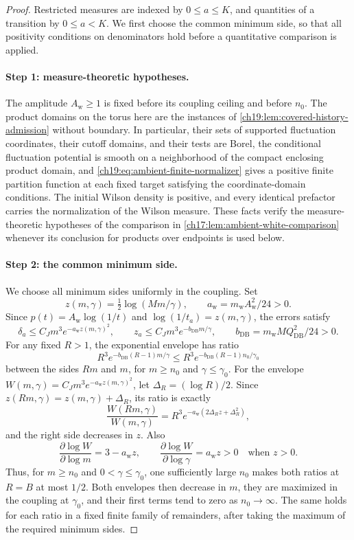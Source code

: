 \begin{proof}
Restricted measures are indexed by $0\le a\le K$, and quantities of a transition by $0\le a<K$. We first choose the common minimum side, so that all positivity conditions on denominators hold before a quantitative comparison is applied.

\paragraph{Step 1: measure-theoretic hypotheses.}
The amplitude $A_{\mathrm w}\ge1$ is fixed before its coupling ceiling and before $n_0$. The product domains on the torus here are the instances of \cref{ch19:lem:covered-history-admission} without boundary. In particular, their sets of supported fluctuation coordinates, their cutoff domains, and their tests are Borel, the conditional fluctuation potential is smooth on a neighborhood of the compact enclosing product domain, and \eqref{ch19:eq:ambient-finite-normalizer} gives a positive finite partition function at each fixed target satisfying the coordinate-domain conditions. The initial Wilson density is positive, and every identical prefactor carries the normalization of the Wilson measure. These facts verify the measure-theoretic hypotheses of the comparison in \cref{ch17:lem:ambient-white-comparison} whenever its conclusion for products over endpoints is used below.

\paragraph{Step 2: the common minimum side.}
We choose all minimum sides uniformly in the coupling. Set
\[
 z(m,\gamma)=\tfrac12\log(Mm/\gamma),\qquad a_{\mathrm w}=m_{\mathrm w}A_{\mathrm w}^2/24>0.
\]
Since $p(t)=A_{\mathrm w}\log(1/t)$ and $\log(1/t_a)=z(m,\gamma)$, the errors satisfy
\[
 \delta_a\le C_Jm^3e^{-a_{\mathrm w}z(m,\gamma)^2},\qquad
 z_a\le C_Jm^3e^{-b_{\mathrm{DB}}m/\gamma},\qquad
 b_{\mathrm{DB}}=m_{\mathrm w}MQ_{\mathrm{DB}}^2/24>0.
\]
For any fixed $R>1$, the exponential envelope has ratio
\[
 R^3e^{-b_{\mathrm{DB}}(R-1)m/\gamma}\le R^3e^{-b_{\mathrm{DB}}(R-1)n_0/\gamma_0}
\]
between the sides $Rm$ and $m$, for $m\ge n_0$ and $\gamma\le\gamma_0$. For the envelope $W(m,\gamma)=C_Jm^3e^{-a_{\mathrm w}z(m,\gamma)^2}$, let $\Delta_R=(\log R)/2$. Since $z(Rm,\gamma)=z(m,\gamma)+\Delta_R$, its ratio is exactly
\[
 \frac{W(Rm,\gamma)}{W(m,\gamma)}=R^3e^{-a_{\mathrm w}(2\Delta_Rz+\Delta_R^2)},
\]
and the right side decreases in $z$. Also
\[
 \frac{\partial\log W}{\partial\log m}=3-a_{\mathrm w}z,\qquad
 \frac{\partial\log W}{\partial\log\gamma}=a_{\mathrm w}z>0\quad\text{when }z>0.
\]
Thus, for $m\ge n_0$ and $0<\gamma\le\gamma_0$, one sufficiently large $n_0$ makes both ratios at $R=B$ at most $1/2$. Both envelopes then decrease in $m$, they are maximized in the coupling at $\gamma_0$, and their first terms tend to zero as $n_0\to\infty$. The same holds for each ratio in a fixed finite family of remainders, after taking the maximum of the required minimum sides.


\end{proof}
